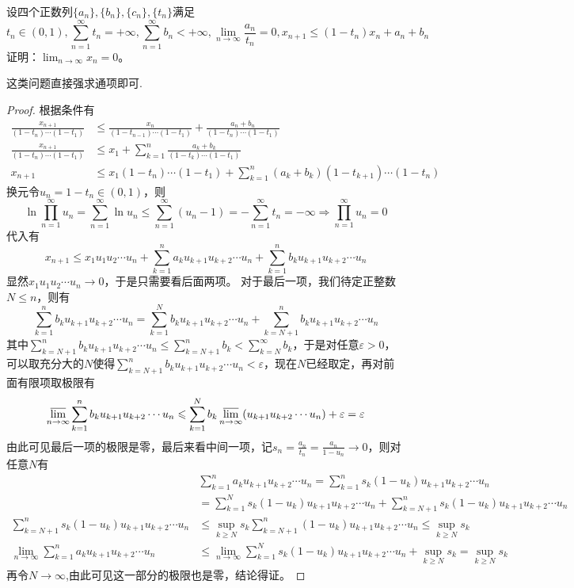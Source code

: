\documentclass[../../main.tex]{subfiles}
\begin{document}
\begin{example}
设四个正数列\(\{a_n\},\{b_n\},\{c_n\},\{t_n\}\)满足
\[t_n\in(0,1),\sum_{n = 1}^{\infty}t_n=+\infty,\sum_{n = 1}^{\infty}b_n<+\infty,\lim_{n\rightarrow\infty}\frac{a_n}{t_n}=0,x_{n + 1}\leqslant (1 - t_n)x_n+a_n + b_n\]
证明：\(\lim_{n\rightarrow\infty}x_n = 0\)。
\end{example}
\begin{note}
这类问题直接强求通项即可.
\end{note}
\begin{proof}
根据条件有
\begin{align*}
\frac{x_{n + 1}}{(1 - t_n)\cdots(1 - t_1)}&\leqslant \frac{x_n}{(1 - t_{n-1})\cdots(1 - t_1)}+\frac{a_n + b_n}{(1 - t_n)\cdots(1 - t_1)}\\
\frac{x_{n + 1}}{(1 - t_n)\cdots(1 - t_1)}&\leqslant  x_1+\sum_{k = 1}^{n}\frac{a_k + b_k}{(1 - t_k)\cdots(1 - t_1)}\\
x_{n + 1}&\leqslant  x_1(1 - t_n)\cdots(1 - t_1)+\sum_{k = 1}^{n}(a_k + b_k)(1 - t_{k + 1})\cdots(1 - t_n)
\end{align*}
换元令\(u_n = 1 - t_n\in(0,1)\)，则
\[\ln\prod_{n = 1}^{\infty}u_n=\sum_{n = 1}^{\infty}\ln u_n\leqslant \sum_{n = 1}^{\infty}(u_n - 1)=-\sum_{n = 1}^{\infty}t_n=-\infty\Rightarrow\prod_{n = 1}^{\infty}u_n = 0\]
代入有
\[x_{n + 1}\leqslant  x_1u_1u_2\cdots u_n+\sum_{k = 1}^{n}a_ku_{k + 1}u_{k + 2}\cdots u_n+\sum_{k = 1}^{n}b_ku_{k + 1}u_{k + 2}\cdots u_n\]
显然\(x_1u_1u_2\cdots u_n\rightarrow0\)，于是只需要看后面两项。
对于最后一项，我们待定正整数\(N\leqslant  n\)，则有
\[\sum_{k = 1}^{n}b_ku_{k + 1}u_{k + 2}\cdots u_n=\sum_{k = 1}^{N}b_ku_{k + 1}u_{k + 2}\cdots u_n+\sum_{k = N + 1}^{n}b_ku_{k + 1}u_{k + 2}\cdots u_n\]
其中\(\sum_{k = N + 1}^{n}b_ku_{k + 1}u_{k + 2}\cdots u_n\leqslant \sum_{k = N + 1}^{n}b_k<\sum_{k = N}^{\infty}b_k\)，于是对任意\(\varepsilon>0\)，可以取充分大的\(N\)使得\(\sum_{k = N + 1}^{n}b_ku_{k + 1}u_{k + 2}\cdots u_n<\varepsilon\)，现在\(N\)已经取定，再对前面有限项取极限有
\[\varlimsup_{n\rightarrow\infty}\sum_{k = 1}^{n}b_ku_{k + 1}u_{k + 2}\cdots u_n\leqslant \sum_{k = 1}^{N}b_k\varlimsup_{n\rightarrow\infty}(u_{k + 1}u_{k + 2}\cdots u_n)+\varepsilon=\varepsilon\]
由此可见最后一项的极限是零，最后来看中间一项，记\(s_n=\frac{a_n}{t_n}=\frac{a_n}{1 - u_n}\rightarrow0\)，则对任意\(N\)有
\begin{align*}
&\sum_{k = 1}^{n}a_ku_{k + 1}u_{k + 2}\cdots u_n=\sum_{k = 1}^{n}s_k(1 - u_k)u_{k + 1}u_{k + 2}\cdots u_n\\
&=\sum_{k = 1}^{N}s_k(1 - u_k)u_{k + 1}u_{k + 2}\cdots u_n+\sum_{k = N + 1}^{n}s_k(1 - u_k)u_{k + 1}u_{k + 2}\cdots u_n\\
\sum_{k = N + 1}^{n}s_k(1 - u_k)u_{k + 1}u_{k + 2}\cdots u_n&\leqslant \sup_{k\geqslant  N}s_k\sum_{k = N + 1}^{n}(1 - u_k)u_{k + 1}u_{k + 2}\cdots u_n\leqslant \sup_{k\geqslant  N}s_k\\
\lim_{n\rightarrow\infty}\sum_{k = 1}^{n}a_ku_{k + 1}u_{k + 2}\cdots u_n&\leqslant \lim_{n\rightarrow\infty}\sum_{k = 1}^{N}s_k(1 - u_k)u_{k + 1}u_{k + 2}\cdots u_n+\sup_{k\geqslant  N}s_k=\sup_{k\geqslant  N}s_k
\end{align*}
再令$N\to \infty$,由此可见这一部分的极限也是零，结论得证。
\end{proof}
\end{document}
